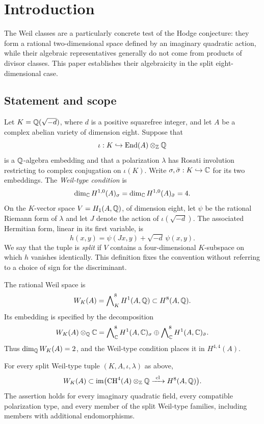 \section{Introduction}
\label{intro:section}

The Weil classes are a particularly concrete test of the Hodge conjecture:
they form a rational two-dimensional space defined by an imaginary
quadratic action, while their algebraic representatives generally do not
come from products of divisor classes.  This paper establishes their
algebraicity in the split eight-dimensional case.

\subsection{Statement and scope}

Let $K=\mathbb Q(\sqrt{-d})$, where $d$ is a positive squarefree integer, and let
$A$ be a complex abelian variety of dimension eight.  Suppose that
\[
 \iota:K\hookrightarrow\operatorname{End}(A)\otimes_\mathbb Z\mathbb Q
\]
is a $\mathbb Q$-algebra embedding and that a polarization $\lambda$ has Rosati
involution restricting to complex conjugation on $\iota(K)$.  Write
$\sigma,\bar\sigma:K\hookrightarrow\mathbb C$ for its two embeddings.
The \emph{Weil-type condition} is
\[
 \dim_\mathbb C H^{1,0}(A)_\sigma=
 \dim_\mathbb C H^{1,0}(A)_{\bar\sigma}=4.
\]
On the $K$-vector space $V=H_1(A,\mathbb Q)$, of dimension eight, let $\psi$
be the rational Riemann form of $\lambda$ and let $J$ denote the action
of $\iota(\sqrt{-d})$.  The associated Hermitian form, linear in its first
variable, is
\begin{equation}
 h(x,y)=\psi(Jx,y)+\sqrt{-d}\,\psi(x,y).
 \label{intro:hermitian}
\end{equation}
We say that the tuple is \emph{split} if $V$ contains a four-dimensional
$K$-subspace on which $h$ vanishes identically.  This definition fixes the
convention without referring to a choice of sign for the discriminant.

The rational Weil space is
\[
 W_K(A)=\bigwedge\nolimits_K^8 H^1(A,\mathbb Q)\subset H^8(A,\mathbb Q).
\]
Its embedding is specified by the decomposition
\[
 W_K(A)\otimes_\mathbb Q\mathbb C=
 \bigwedge\nolimits_\mathbb C^8H^1(A,\mathbb C)_\sigma
 \oplus
 \bigwedge\nolimits_\mathbb C^8H^1(A,\mathbb C)_{\bar\sigma}.
\]
Thus $\dim_\mathbb Q W_K(A)=2$, and the Weil-type condition places it in
$H^{4,4}(A)$.

\begin{theorem}
\label{intro:main}
For every split Weil-type tuple $(K,A,\iota,\lambda)$ as above,
\[
 W_K(A)\subset
 \operatorname{im}\bigl(\operatorname{CH}^4(A)\otimes_\mathbb Z\mathbb Q
                \xrightarrow{\ \mathrm{cl}\ }H^8(A,\mathbb Q)\bigr).
\]
The assertion holds for every imaginary quadratic field, every compatible
polarization type, and every member of the split Weil-type families,
including members with additional endomorphisms.
\end{theorem}

